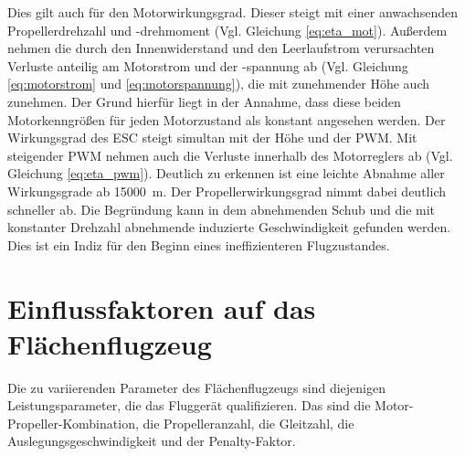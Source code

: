 Dies gilt auch für den Motorwirkungsgrad. Dieser steigt mit einer anwachsenden Propellerdrehzahl und -drehmoment (Vgl. Gleichung \ref{eq:eta_mot}). Außerdem nehmen die durch den Innenwiderstand und den Leerlaufstrom verursachten Verluste anteilig am Motorstrom und der -spannung ab (Vgl. Gleichung \ref{eq:motorstrom} und \ref{eq:motorspannung}), die mit zunehmender Höhe auch zunehmen. Der Grund hierfür liegt in der Annahme, dass diese beiden Motorkenngrößen für jeden Motorzustand als konstant angesehen werden. Der Wirkungsgrad des ESC steigt simultan mit der Höhe und der PWM. Mit steigender PWM nehmen auch die Verluste innerhalb des Motorreglers ab (Vgl. Gleichung \ref{eq:eta_pwm}). Deutlich zu erkennen ist eine leichte Abnahme aller Wirkungsgrade ab \SI{15000}{m}. Der Propellerwirkungsgrad nimmt dabei deutlich schneller ab. Die Begründung kann in dem abnehmenden Schub und die mit konstanter Drehzahl abnehmende induzierte Geschwindigkeit gefunden werden. Dies ist ein Indiz für den Beginn eines ineffizienteren Flugzustandes.



\section{Einflussfaktoren auf das Flächenflugzeug}
Die zu variierenden Parameter des Flächenflugzeugs sind diejenigen Leistungsparameter, die das Fluggerät qualifizieren. Das sind die Motor-Propeller-Kombination, die Propelleranzahl, die Gleitzahl, die Auslegungsgeschwindigkeit und der Penalty-Faktor.

